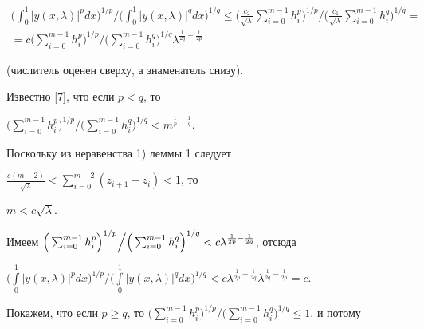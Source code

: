 \begin{multline*} 


\bigg(\int^1_0|y(x,\lambda)|^p dx\bigg)^{1/p}\Big/ 


\bigg(\int^1_0|y(x,\lambda)|^q dx\bigg)^{1/q}\le 


\bigg(\frac{c_2}{\sqrt{\lambda}}\sum^{m-1}_{i=0}h^p_i\bigg)^{1/p} 


\Big/ 


\bigg(\frac{c_1}{\sqrt{\lambda}}\sum^{m-1}_{i=0}h^q_i\bigg)^{1/q} 


= \\ =c\bigg(\sum^{m-1}_{i=0}h^p_i\bigg)^{1/p}\Big/ 


\bigg(\sum^{m-1}_{i=0}h^q_i\bigg)^{1/q} 


\lambda^{\frac{1}{2q}-\frac{1}{2p}} 


\end{multline*} 


(числитель оценен сверху, а знаменатель снизу). 


 


Известно [7], что если $p<q$, то 


$\Big(\sum^{m-1}_{i=0}h^p_i\Big)^{1/p}\Big/ 


\Big(\sum^{m-1}_{i=0}h^q_i\Big)^{1/q}<m^{\frac{1}{p}-\frac{1}{q}}$. 


Поскольку из неравенства 1) леммы 1 следует 


$\frac{c(m-2)}{\sqrt{\lambda}}<\sum^{m-2}_{i=0}(z_{i+1}-z_i)<1$, то 


$m<c\sqrt{\lambda}$. 


Имеем $\Big(\sum^{m-1}_{i=0}h^p_i\Big)^{1/p}\Big/ \linebreak


\Big(\sum^{m-1}_{i=0}h^q_i\Big)^{1/q}< 


c\lambda^{\frac{1}{2p}-\frac{1}{2q}}$, отсюда 


$\Big(\int\limits^1_0|y(x,\lambda)|^p dx\Big)^{1/p}\Big/ 


\Big(\int\limits^1_0|y(x,\lambda)|^q dx\Big)^{1/q} 


<c\lambda^{\frac{1}{2p}-\frac{1}{2q}} 


\lambda^{\frac{1}{2q}-\frac{1}{2p}}=c$. 


 


Покажем, что если $p\ge q$, то $\Big(\sum^{m-1}_{i=0}h^p_i\Big)^{1/p} 


\Big/\Big(\sum^{m-1}_{i=0}h^q_i\Big)^{1/q}\le1$, и потому \\


